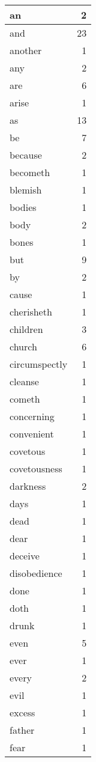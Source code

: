 \begin{center}
\begin{longtable}{l|r}
an & 2\\ \hline 
and & 23\\ \hline 
another & 1\\ \hline 
any & 2\\ \hline 
are & 6\\ \hline 
arise & 1\\ \hline 
as & 13\\ \hline 
be & 7\\ \hline 
because & 2\\ \hline 
becometh & 1\\ \hline 
blemish & 1\\ \hline 
bodies & 1\\ \hline 
body & 2\\ \hline 
bones & 1\\ \hline 
but & 9\\ \hline 
by & 2\\ \hline 
cause & 1\\ \hline 
cherisheth & 1\\ \hline 
children & 3\\ \hline 
church & 6\\ \hline 
circumspectly & 1\\ \hline 
cleanse & 1\\ \hline 
cometh & 1\\ \hline 
concerning & 1\\ \hline 
convenient & 1\\ \hline 
covetous & 1\\ \hline 
covetousness & 1\\ \hline 
darkness & 2\\ \hline 
days & 1\\ \hline 
dead & 1\\ \hline 
dear & 1\\ \hline 
deceive & 1\\ \hline 
disobedience & 1\\ \hline 
done & 1\\ \hline 
doth & 1\\ \hline 
drunk & 1\\ \hline 
even & 5\\ \hline 
ever & 1\\ \hline 
every & 2\\ \hline 
evil & 1\\ \hline 
excess & 1\\ \hline 
father & 1\\ \hline 
fear & 1\\ \hline 

\end{longtable}
\end{center}
